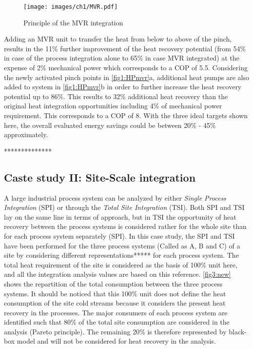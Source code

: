       \begin{figure}[h]
 \begin{center}
 \texttt{[image: images/ch1/MVR.pdf]}
 \caption{Principle of the MVR integration}
 \label{fig1:MVR}
 \end{center}
 \end{figure}
 
 Adding an MVR unit to transfer the heat from below to above of the pinch, results in the 11\% further improvement of the heat recovery potential (from 54\% in case of the process integration alone to 65\% in case MVR integrated) at the expense of 2\% mechanical power which corresponds to a COP of 5.5. Considering the newly activated pinch points in \cref{fig1:HPmvr}a, additional heat pumps are also added to system in \cref{fig1:HPmvr}b in order to further increase the heat recovery potential up to 86\%. This results to 32\% additional heat recovery than the original heat integration opportunities including 4\% of mechanical power requirement. This corresponds to a COP of 8. With the three ideal targets shown here, the overall evaluated energy savings could be between 20\% - 45\% approximately.
          
**************

\subsection{Caste study II: Site-Scale integration}

A large industrial process system can be analyzed by either \textit{Single Process Integration} (SPI) or through the \textit{Total Site Integration} (TSI). Both SPI and TSI lay on the same line in terms of approach, but in TSI the opportunity of heat recovery between the process systems is considered rather for the whole site than for each process system separately (SPI). In this case study, the SPI and TSI have been performed for the three process systems (Called as A, B and C) of a site by considering different representations***** for each process system. The total heat requirement of the site is considered as the basis of 100\% unit here, and all the integration analysis values are based on this reference. \cref{fig3:new} shows the repartition of the total consumption between the three process systems. It should be noticed that this 100\% unit does not define the heat consumption of the site cold streams because it considers the present heat recovery in the processes. The major consumers of each process system are identified such that 80\% of the total site consumption are considered in the analysis (Pareto principle). The remaining 20\% is therefore represented by black-box model and will not be considered for heat recovery in the analysis. 

